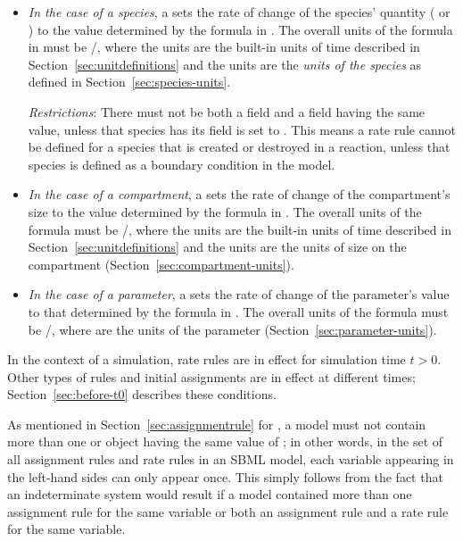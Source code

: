 \begin{itemize}
  
\item \emph{In the case of a species}, a \RateRule sets the rate
  of change of the species' quantity ( or
  ) to the value determined by the
  formula in .  The overall units of the formula in
   must be /, where the  units are
  the built-in units of time described in
  Section~\ref{sec:unitdefinitions} and the  units are the \emph{units of the species} as defined
  in Section~\ref{sec:species-units}.
  
  \emph{Restrictions}: There must not be both a \RateRule
   field and a \SpeciesReference {}
  field having the same value, unless that species has its
   field is set to .  This
  means a rate rule cannot be defined for a species that is
  created or destroyed in a reaction, unless that species is
  defined as a boundary condition in the model.
  
\item \emph{In the case of a compartment}, a \RateRule sets the
  rate of change of the compartment's size to the value determined
  by the formula in .  The overall units of the
  formula must be /, where the
   units are the built-in units of time described
  in Section~\ref{sec:unitdefinitions} and the 
  units are the units of size on the compartment
  (Section~\ref{sec:compartment-units}).

\item \emph{In the case of a parameter}, a \RateRule sets the rate
  of change of the parameter's value to that determined by the
  formula in .  The overall units of the formula must
  be /, where  are the
  units of the parameter (Section~\ref{sec:parameter-units}).

\end{itemize}

In the context of a simulation, rate rules are in effect for
simulation time $t > 0$.  Other types of rules and initial
assignments are in effect at different times;
Section~\ref{sec:before-t0} describes these conditions.

As mentioned in Section~\ref{sec:assignmentrule} for
\AssignmentRule, a model must not contain more than one \RateRule
or \AssignmentRule object having the same value of
; in other words, in the set of all assignment
rules and rate rules in an SBML model, each variable appearing in
the left-hand sides can only appear once.  This simply follows
from the fact that an indeterminate system would result if a model
contained more than one assignment rule for the same variable or
both an assignment rule and a rate rule for the same variable.


